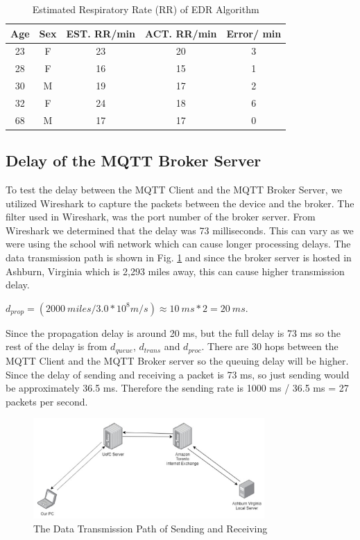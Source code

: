 \documentclass[conference]{IEEEtran}
\begin{document}
\begin{table}[htbp]
\centering
\caption{Estimated Respiratory Rate (RR) of EDR Algorithm}
\label{tedr}
\begin{tabular}{|c|c|c|c|c|}
\hline
\textbf{Age} & \textbf{Sex} & \textbf{EST. RR/min} & \textbf{ACT. RR/min} & \textbf{Error/ min} \\ \hline
23 & F & 23 & 20 & 3 \\ \hline
28 & F & 16 & 15 & 1 \\ \hline
30 & M & 19 & 17 & 2 \\ \hline
32 & F & 24 & 18 & 6 \\ \hline
68 & M & 17 & 17 & 0 \\ \hline
\end{tabular}
\end{table}

\subsection{Delay of the MQTT Broker Server}
To test the delay between the MQTT Client and the MQTT Broker Server, we utilized Wireshark \cite{b20} to capture the packets between the device and the broker. The filter used in Wireshark, was the port number of the broker server. From Wireshark we determined that the delay was 73 milliseconds. This can vary as we were using the school wifi network which can cause longer processing delays. The data transmission path is shown in Fig. \ref{delay} and since the broker server is hosted in Ashburn, Virginia which is 2,293 miles away, this can cause higher transmission delay. 

\begin{center}
$d_{prop} = (2000\ miles / 3.0 * 10^8 m/s) \approx 10\ ms * 2 = 20\ ms$.
\end{center}

Since the propagation delay is around 20 ms, but the full delay is 73 ms so the rest of the delay is from $d_{queue}$, $d_{trans}$ and $d_{proc}$. There are 30 hops between the MQTT Client and the MQTT Broker server so the queuing delay will be higher. Since the delay of sending and receiving a packet is 73 ms, so just sending would be approximately 36.5 ms. Therefore the sending rate is 1000 ms / 36.5 ms = 27 packets per second.

\begin{figure}[htbp]
\centering
\includegraphics[width=250pt]{delay.png}
\caption{The Data Transmission Path of Sending and Receiving}
\label{delay}
\end{figure}
\end{document}
